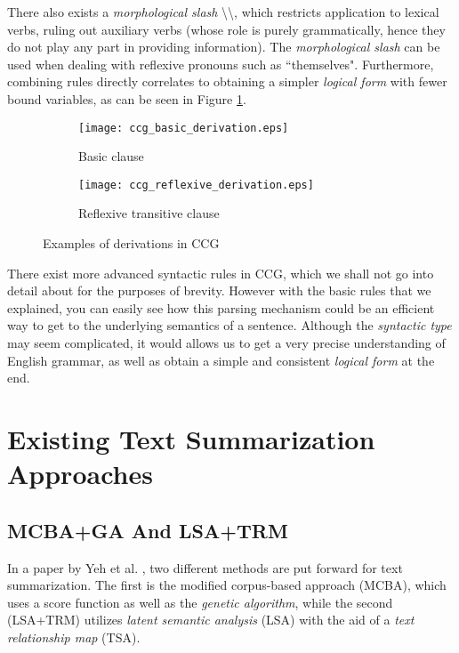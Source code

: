 \mbox{}

There also exists a \textit{morphological slash} \textbackslash\textbackslash, which restricts application to lexical verbs, ruling out auxiliary verbs (whose role is purely grammatically, hence they do not play any part in providing information). The \textit{morphological slash} can be used when dealing with reflexive pronouns such as ``themselves". Furthermore, combining rules directly correlates to obtaining a simpler \textit{logical form} with fewer bound variables, as can be seen in Figure \ref{fig:ccg_derivations}.

\begin{figure}[H]
\centering
\begin{subfigure}{0.3\textwidth}
\centering
\texttt{[image: ccg\_basic\_derivation.eps]}
\caption{\cite{steedman_combinatory_nodate} Basic clause}
\end{subfigure}
\begin{subfigure}{0.6\textwidth}
\centering
\texttt{[image: ccg\_reflexive\_derivation.eps]}
\caption{\cite{steedman_combinatory_nodate} Reflexive transitive clause}
\end{subfigure}
\caption{Examples of derivations in CCG}
\label{fig:ccg_derivations}
\end{figure}

There exist more advanced syntactic rules in CCG, which we shall not go into detail about for the purposes of brevity. However with the basic rules that we explained, you can easily see how this parsing mechanism could be an efficient way to get to the underlying semantics of a sentence. Although the \textit{syntactic type} may seem complicated, it would allows us to get a very precise understanding of English grammar, as well as obtain a simple and consistent \textit{logical form} at the end.

\section{Existing Text Summarization Approaches}

\subsection{MCBA+GA And LSA+TRM}

In a paper by Yeh et al. \cite{yeh_text_2005}, two different methods are put forward for text summarization. The first is the modified corpus-based approach (MCBA), which uses a score function as well as the \textit{genetic algorithm}, while the second (LSA+TRM) utilizes \textit{latent semantic analysis} (LSA) with the aid of a \textit{text relationship map} (TSA).

